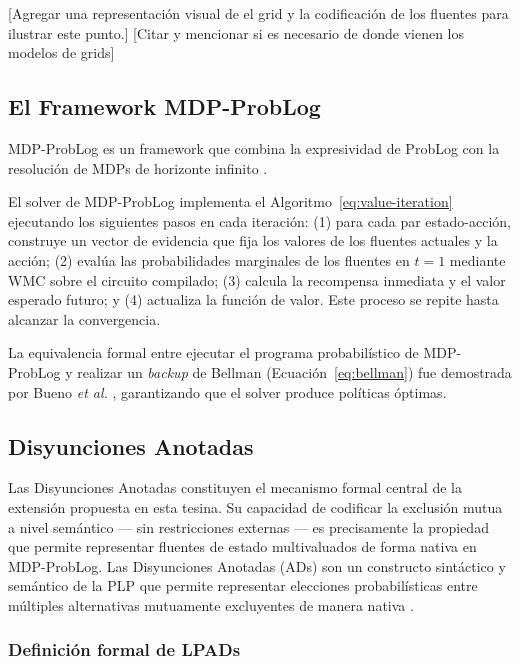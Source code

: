 [Agregar una representación visual de el grid y la codificación de los fluentes para ilustrar este punto.]
[Citar y mencionar si es necesario de donde vienen los modelos de grids]

\clearpage

\subsection{El Framework MDP-ProbLog}
\label{sec:mt-mdpproblog}

MDP-ProbLog es un framework que combina la expresividad de ProbLog con la resolución de MDPs de horizonte infinito \cite{bueno2016mdp}. 


El solver de MDP-ProbLog implementa el Algoritmo~\ref{eq:value-iteration} ejecutando los siguientes pasos en cada iteración: (1) para cada par estado-acción, construye un vector de evidencia que fija los valores de los fluentes actuales y la acción; (2) evalúa las probabilidades marginales de los fluentes en $t=1$ mediante WMC sobre el circuito compilado; (3) calcula la recompensa inmediata y el valor esperado futuro; y (4) actualiza la función de valor. Este proceso se repite hasta alcanzar la convergencia.

La equivalencia formal entre ejecutar el programa probabilístico de MDP-ProbLog y realizar un \textit{backup} de Bellman (Ecuación~\ref{eq:bellman}) fue demostrada por Bueno \textit{et al.} \cite{bueno2016mdp}, garantizando que el solver produce políticas óptimas.

\subsection{Disyunciones Anotadas}
\label{sec:mt-ads}

Las Disyunciones Anotadas constituyen el mecanismo formal central de la extensión propuesta en esta tesina. Su capacidad de codificar la exclusión mutua a nivel semántico --- sin restricciones externas --- es precisamente la propiedad que permite representar fluentes de estado multivaluados de forma nativa en MDP-ProbLog. Las Disyunciones Anotadas (ADs) son un constructo sintáctico y semántico de la PLP que permite representar elecciones probabilísticas entre múltiples alternativas mutuamente excluyentes de manera nativa \cite{vennekens2004lpads}.

\subsubsection{Definición formal de LPADs}

